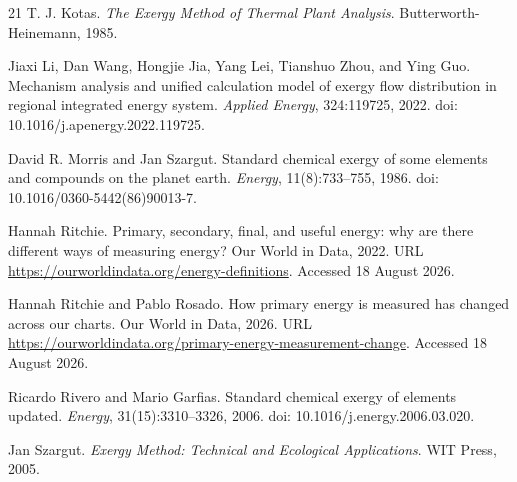 \documentclass[11pt]{article}
\begin{document}
\begin{thebibliography}{21}
T. J. Kotas.
\newblock \textit{The Exergy Method of Thermal Plant Analysis}.
\newblock Butterworth-Heinemann, 1985.

Jiaxi Li, Dan Wang, Hongjie Jia, Yang Lei, Tianshuo Zhou, and Ying Guo.
\newblock Mechanism analysis and unified calculation model of exergy flow distribution in regional integrated energy system.
\newblock \textit{Applied Energy}, 324:119725, 2022.
\newblock doi: 10.1016/j.apenergy.2022.119725.

David R. Morris and Jan Szargut.
\newblock Standard chemical exergy of some elements and compounds on the planet earth.
\newblock \textit{Energy}, 11(8):733--755, 1986.
\newblock doi: 10.1016/0360-5442(86)90013-7.

Hannah Ritchie.
\newblock Primary, secondary, final, and useful energy: why are there different ways of measuring energy?
\newblock Our World in Data, 2022.
\newblock URL \url{https://ourworldindata.org/energy-definitions}.
\newblock Accessed 18 August 2026.

Hannah Ritchie and Pablo Rosado.
\newblock How primary energy is measured has changed across our charts.
\newblock Our World in Data, 2026.
\newblock URL \url{https://ourworldindata.org/primary-energy-measurement-change}.
\newblock Accessed 18 August 2026.

Ricardo Rivero and Mario Garfias.
\newblock Standard chemical exergy of elements updated.
\newblock \textit{Energy}, 31(15):3310--3326, 2006.
\newblock doi: 10.1016/j.energy.2006.03.020.

Jan Szargut.
\newblock \textit{Exergy Method: Technical and Ecological Applications}.
\newblock WIT Press, 2005.

\end{thebibliography}
\end{document}
